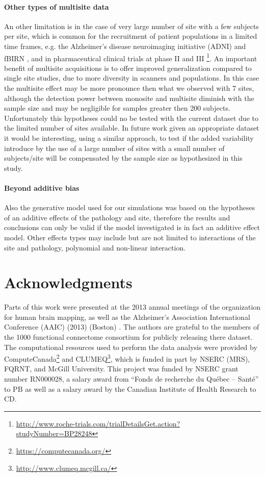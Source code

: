 \documentclass[authoryear]{elsarticle}
\begin{document}
\paragraph{Other types of multisite data} An other limitation is in the case of very large number of site with a few subjects per site, which is common for the recruitment of patient populations in a limited time frames, e.g. the Alzheimer’s disease neuroimaging initiative (ADNI) \citep{Mueller2005} and fBIRN \citep{Friedman2006,Friedman2006a}, and in pharmaceutical clinical trials at phase II and III \footnote{\url{http://www.roche-trials.com/trialDetailsGet.action?studyNumber=BP28248}}. An important benefit of multisite acquisitions is to offer improved generalization compared to single site studies, due to more diversity in scanners and populations. In this case the multisite effect may be more pronounce then what we observed with 7 sites, although the detection power between monosite and multisite diminish with the sample size and may be negligible for samples greater then 200 subjects. Unfortunately this hypotheses could no be tested with the current dataset due to the limited number of sites available. In future work given an appropriate dataset it would be interesting, using a similar approach, to test if the added variability introduce by the use of a large number of sites with a small number of subjects/site will be compensated by the sample size as hypothesized in this study.

\paragraph{Beyond additive bias} Also the generative model used for our simulations was based on the hypotheses of an additive effects of the pathology and site, therefore the results and conclusions can only be valid if the model investigated is in fact an additive effect model. Other effects types may include but are not limited to interactions of the site and pathology, polynomial and non-linear interaction.

\section{Acknowledgments}
Parts of this work were presented at the 2013 annual meetings of the organization for human brain mapping, as well as the  Alzheimer's Association International Conference (AAIC) (2013) (Boston) \citep{Dansereau2013b}. The authors are grateful to the members of the 1000 functional connectome consortium for publicly releasing there dataset. The computational resources used to perform the data analysis were provided by ComputeCanada\footnote{\url{https://computecanada.org/}} and CLUMEQ\footnote{\url{http://www.clumeq.mcgill.ca/}}, which is funded in part by NSERC (MRS), FQRNT, and McGill University. This project was funded by NSERC grant number RN000028, a salary award from ``Fonds de recherche du Qu\'ebec -- Sant\'e'' to PB as well as a salary award by the Canadian Institute of Health Research to CD.
\end{document}
